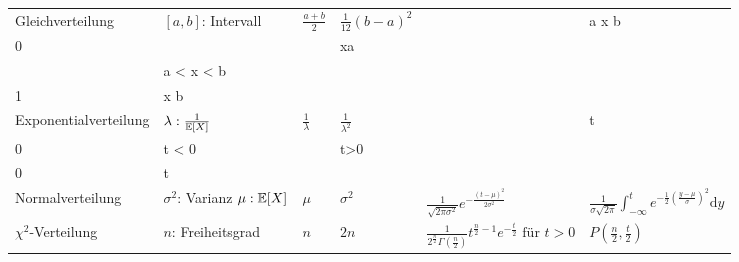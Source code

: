 \begin{center}
\begin{table*}
\begin{tabularx}{\textwidth}{llXXXX}
			Gleichverteilung         & \( [a,b] \): Intervall               & \( \frac{a+b}{2} \)              & \( \frac{1}{12}(b-a)^2 \)        & \(\begin{cases} \frac{1}{b-a} &a \le x \le b \\ 0 & \text{sonst}\end{cases}\)                                                                                                                & \(\begin{cases} 0 & x\le a \\ \frac{t-a}{b-a} & a < x < b \\ 1 & x \ge b \end{cases}\)                \\
		
				Exponentialverteilung    & \( \lambda: \frac{1}{\mathbb{E}[X]} \)       & \( \frac{1}{\lambda} \)          & \( \frac{1}{\lambda^2} \)        & \( \begin{cases} \lambda e^{-\lambda t} & t \geq 0 \\ 0 & t < 0 \end{cases} \)                                                                                                              & \( \begin{cases} 1-e^{-\lambda t} & t>0 \\ 0 & t \leq 0\end{cases}\)               \\
		
				Normalverteilung         & \makecell[l]{\( \sigma^2 \): Varianz                                                                                                                                                                                                                                                                       \\ \( \mu: \mathbb{E}[X] \)} & \( \mu \) & \( \sigma ^2 \) & \( \frac{1}{\sqrt{2\pi \sigma^2} }e^{-{\frac{(t-\mu)^2}{2\sigma^2} }} \) & \( \frac{1}{\sigma {\sqrt{2\pi}}} \int_{-\infty}^t e^{-\frac{1}{2}\left( \frac{y-\mu}{\sigma} \right) ^2} \mathrm{d} y \) \\
		
				\( \chi ^2 \)-Verteilung & \( n \): Freiheitsgrad               & \( n \)                          & \( 2n \)                         & \( \frac{1}{2^{\frac{n}{2}}\Gamma (\frac{n}{2})} t^{\frac{n}{2}-1} e^{-\frac{t}{2}} \text{ für } t>0\)                                        & \(P\left( \frac{n}{2}, \frac{t}{2}\right) \) \\
		

\end{tabularx}
\end{table*}
\end{center}
